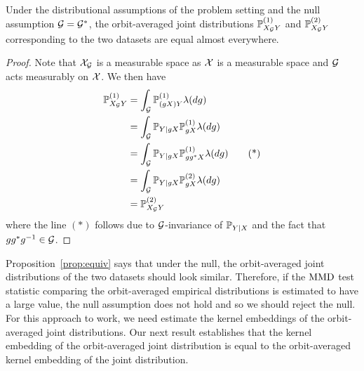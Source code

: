 \begin{proposition} \label{prop:equiv}
Under the distributional assumptions of the problem setting and the null assumption $\calG=\calG^*$, the orbit-averaged joint distributions $\P_{X_\calG Y}^{(1)}$ and $\P_{X_\calG Y}^{(2)}$ corresponding to the two datasets are equal almost everywhere.
\end{proposition}
\begin{proof}
Note that $\calX_\calG$ is a measurable space as $\calX$ is a measurable space and $\calG$ acts measurably on $\calX$. We then have
\begin{align*}
\P_{X_\calG Y}^{(1)} &= \int_{\calG}\P_{(gX)Y}^{(1)}\lambda(dg) \\
&= \int_{\calG}\P_{Y|gX}\P_{gX}^{(1)}\lambda(dg) \\
&= \int_{\calG}\P_{Y|gX}\P_{gg^*X}^{(1)}\lambda(dg) \tag{*} \\
&= \int_{\calG}\P_{Y|gX}\P_{gX}^{(2)}\lambda(dg) \\
&= \P_{X_\calG Y}^{(2)}
\end{align*}
where the line $(*)$ follows due to $\calG$-invariance of $\P_{Y|X}$ and the fact that $gg^*g^{-1}\in\calG$.
\end{proof}

Proposition~\ref{prop:equiv} says that under the null, the orbit-averaged joint distributions of the two datasets should look similar. Therefore, if the $\MMD$ test statistic comparing the orbit-averaged empirical distributions is estimated to have a large value, the null assumption does not hold and so we should reject the null. For this approach to work, we need estimate the kernel embeddings of the orbit-averaged joint distributions. Our next result establishes that the kernel embedding of the orbit-averaged joint distribution is equal to the orbit-averaged kernel embedding of the joint distribution.

